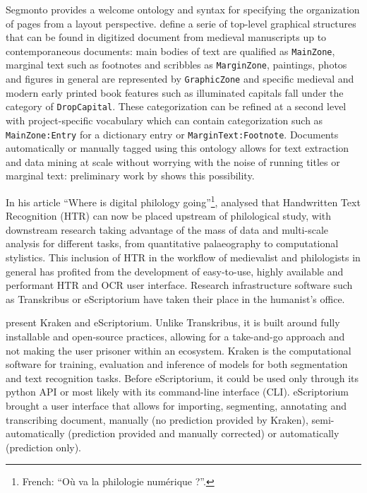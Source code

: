 \documentclass{jdmdh}
\begin{document}
Segmonto provides a welcome ontology and syntax for specifying the organization of pages from a layout perspective. \citet{gabay2021segmonto} define a serie of top-level graphical structures that can be found in digitized document from medieval manuscripts up to contemporaneous documents: main bodies of text are qualified as \texttt{MainZone}, marginal text such as footnotes and scribbles as \texttt{MarginZone}, paintings, photos and figures in general are represented by \texttt{GraphicZone} and specific medieval and modern early printed book features such as illuminated capitals fall under the category of \texttt{DropCapital}. These categorization can be refined at a second level with project-specific vocabulary which can contain categorization such as \texttt{MainZone:Entry} for a dictionary entry or \texttt{MarginText:Footnote}. Documents automatically or manually tagged using this ontology allows for text extraction and data mining at scale without worrying with the noise of running titles or marginal text: preliminary work by \citet{christensen2022gallic} shows this possibility.

In his article ``Where is digital philology going''\footnote{French: ``Où va la philologie numérique ?''.}, \citet{camps2018o} analysed that Handwritten Text Recognition (HTR) can now be placed upstream of philological study, with downstream research taking advantage of the mass of data and multi-scale analysis for different tasks, from quantitative palaeography to computational stylistics. This inclusion of HTR in the workflow of medievalist and philologists in general has profited from the development of easy-to-use, highly available and performant HTR and OCR user interface. Research infrastructure software such as Transkribus \citep{kahle2017transkribus} or eScriptorium have taken their place in the humanist's office.

\citet{kiessling2019escriptorium} present Kraken and eScriptorium. Unlike Transkribus, it is built around fully installable and open-source practices, allowing for a take-and-go approach and not making the user prisoner within an ecosystem. Kraken is the computational software for training, evaluation and inference of models for both segmentation and text recognition tasks. Before eScriptorium, it could be used only through its python API or most likely with its command-line interface (CLI). eScriptorium brought a user interface that allows for importing, segmenting, annotating and transcribing document, manually (no prediction provided by Kraken), semi-automatically (prediction provided and manually corrected) or automatically (prediction only).
\end{document}
